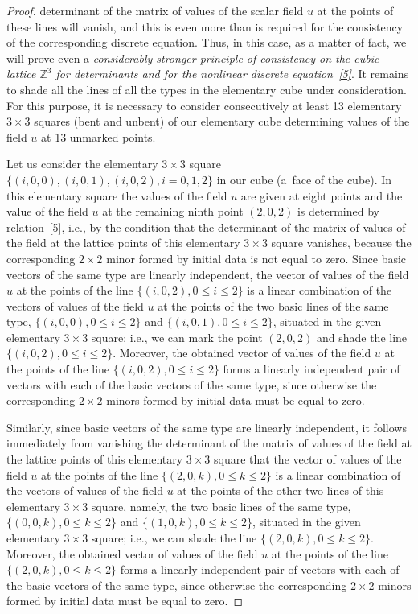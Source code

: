 \documentclass[pdftex]{sigma}
\begin{document}
\begin{proof}
determinant of the matrix of values of the scalar f\/ield $u$ at the
points of these lines will vanish, and this is even more than is
required for the consistency of the corresponding discrete equation.
Thus, in this case, as a matter of fact, we will prove even a {\it
considerably stronger principle of consistency on the cubic lattice
$\mathbb{Z}^3$ for determinants and for the nonlinear discrete
equation~\eqref{5}}. It remains to shade all the lines of all
the types in the elementary cube under consideration. For this
purpose, it is necessary to consider consecutively at least 13
elementary $3 \times 3$ squares (bent and unbent) of our elementary
cube determining values of the f\/ield $u$ at 13 unmarked points.


Let us consider the elementary $3 \times 3$ square $\{(i, 0, 0), (i,
0, 1), (i, 0, 2), i = 0, 1, 2\}$ in our cube (a~face of the cube).
In this elementary square the values of the f\/ield $u$ are given at
eight points and the value of the f\/ield $u$ at the remaining ninth
point $(2, 0, 2)$ is determined by relation~\eqref{5}, i.e.,
by the condition that the determinant of the matrix of values of the
f\/ield at the lattice points of this elementary $3 \times 3$ square
vanishes, because the corresponding $2 \times 2$ minor formed by
initial data is not equal to zero. Since basic vectors of the same
type are linearly independent, the vector of values of the f\/ield $u$
at the points of the line $\{(i, 0, 2), 0 \leq i \leq 2\}$ is a
linear combination of the vectors of values of the f\/ield $u$ at the
points of the two basic lines of the same type, $\{(i, 0, 0), 0 \leq
i \leq 2\}$ and $\{(i, 0, 1), 0 \leq i \leq 2\}$, situated in the
given elementary $3 \times 3$ square; i.e., we can mark the point
$(2, 0, 2)$ and shade the line $\{(i, 0, 2), 0 \leq i \leq 2\}$.
Moreover, the obtained vector of values of the f\/ield $u$ at the
points of the line $\{(i, 0, 2), 0 \leq i \leq 2\}$ forms a linearly
independent pair of vectors with each of the basic vectors of the
same type, since otherwise the corresponding $2 \times 2$ minors
formed by initial data must be equal to zero.



Similarly, since basic vectors of the same type are linearly
independent, it follows imme\-diately from vanishing the determinant
of the matrix of values of the f\/ield at the lattice points of this
elementary $3 \times 3$ square that the vector of values of the
f\/ield $u$ at the points of the line $\{(2, 0, k), 0 \leq k \leq 2\}$
is a linear combination of the vectors of values of the f\/ield $u$ at
the points of the other two lines of this elementary $3 \times 3$
square, namely, the two basic lines of the same type, $\{(0, 0, k),
0 \leq k \leq 2\}$ and $\{(1, 0, k), 0 \leq k \leq 2\}$, situated in
the given elementary $3 \times 3$ square; i.e., we can shade the
line $\{(2, 0, k), 0 \leq k \leq 2\}$. Moreover, the obtained vector
of values of the f\/ield $u$ at the points of the line $\{(2, 0, k), 0
\leq k \leq 2\}$ forms a linearly independent pair of vectors with
each of the basic vectors of the same type, since otherwise the
corresponding $2 \times 2$ minors formed by initial data must be
equal to zero.



\end{proof}
\end{document}
